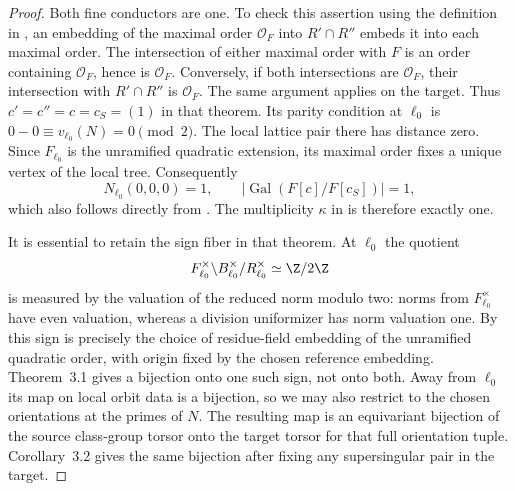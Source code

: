 \begin{proof}
Both fine conductors are one. To check this assertion using the
definition in \cite[\S3.3]{cornutjetchev}, an embedding of the maximal
order $\mathcal O_F$ into $R'\cap R''$ embeds it into each maximal
order. The intersection of either maximal order with $F$ is an order
containing $\mathcal O_F$, hence is $\mathcal O_F$. Conversely,
if both intersections are $\mathcal O_F$, their intersection with
$R'\cap R''$ is $\mathcal O_F$. The same argument applies on the
target. Thus $c'=c''=c=c_S=(1)$ in that theorem. Its parity
condition at $\ell_0$ is $0-0\equiv v_{\ell_0}(N)=0\pmod2$.
The local lattice pair there has distance zero. Since $F_{\ell_0}$
is the unramified quadratic extension, its maximal order fixes a
unique vertex of the local tree. Consequently
\[
 N_{\ell_0}(0,0,0)=1,\qquad
 |\operatorname{Gal}(F[c]/F[c_S])|=1,
\]
which also follows directly from
\cite[Lemma~2.1(ii)]{cornutjetchev}. The multiplicity $\kappa$ in
\cite[Theorem~3.1]{cornutjetchev} is therefore exactly one.

It is essential to retain the sign fiber in that theorem. At $\ell_0$
the quotient
\[
 F_{\ell_0}^{\times}\backslash B_{\ell_0}^{\times}/R_{\ell_0}^{\times}
       \simeq\Z/2\Z
\]
is measured by the valuation of the reduced norm modulo two:
norms from $F_{\ell_0}^{\times}$ have even valuation, whereas a
division uniformizer has norm valuation one.
By \cite[\S3.6]{cornutjetchev} this sign is precisely the choice of
residue-field embedding of the unramified quadratic order, with
origin fixed by the chosen reference embedding. Theorem~3.1 gives
a bijection onto one such sign, not onto both. Away from $\ell_0$
its map on local orbit data is a bijection, so we may also restrict
to the chosen orientations at the primes of $N$. The resulting
map is an equivariant bijection of the source class-group torsor
onto the target torsor for that full orientation tuple. Corollary~3.2
gives the same bijection after fixing any supersingular pair in the
target.


\end{proof}
